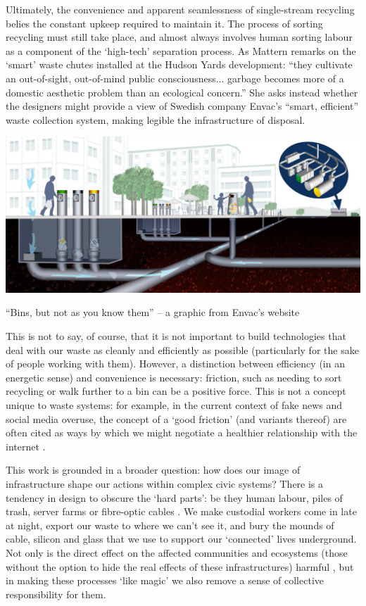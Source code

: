 \documentclass[nofonts,nols,justified,nobib]{tufte-book}
\begin{document}
Ultimately, the convenience and apparent seamlessness of single-stream recycling belies the constant upkeep required to maintain it. The process of sorting recycling must still take place, and almost always involves human sorting labour as a component of the `high-tech' separation process. As Mattern remarks on the `smart' waste chutes installed at the Hudson Yards development: ``they cultivate an out-of-sight, out-of-mind public consciousness... garbage becomes more of a domestic aesthetic problem than an ecological concern.'' She asks instead whether the designers might provide a view of Swedish company Envac's ``smart, efficient'' waste collection system, making legible the infrastructure of disposal. \cite{mattern_instrumental_2016}

\begin{marginfigure}
\includegraphics[width=\textwidth]{img/1/envac.jpg}
\caption{``Bins, but not as you know them'' -- a graphic from Envac's website\label{b} \cite{envac_smart_nodate}}
\end{marginfigure}

This is not to say, of course, that it is not important to build technologies that deal with our waste as cleanly and efficiently as possible (particularly for the sake of people working with them). However, a distinction between efficiency (in an energetic sense) and convenience is necessary: friction, such as needing to sort recycling or walk further to a bin can be a positive force. This is not a concept unique to waste systems: for example, in the current context of fake news and social media overuse, the concept of a `good friction' (and variants thereof) are often cited as ways by which we might negotiate a healthier relationship with the internet \cite{donath_signals_2011, tufekci_twitter_2017}. %

This work is grounded in a broader question: how does our image of infrastructure shape our actions within complex civic systems? There is a tendency in design to obscure the `hard parts': be they human labour, piles of trash, server farms or fibre-optic cables \cite{mattern_infrastructural_2013}. We make custodial workers come in late at night, export our waste to where we can't see it, and bury the mounds of cable, silicon and glass that we use to support our `connected' lives underground. Not only is the direct effect on the affected communities and ecosystems (those without the option to hide the real effects of these infrastructures) harmful \cite{liboiron_why_2014}, but in making these processes `like magic' we also remove a sense of collective responsibility for them.
\end{document}
